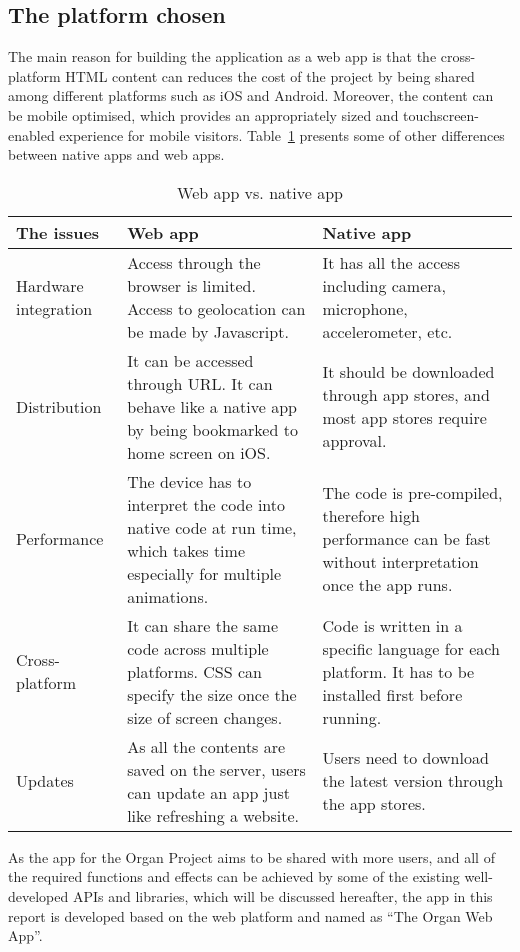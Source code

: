 \subsection{The platform chosen}
The main reason for building the application as a web app is that the cross-platform HTML content can reduces the cost of the project by being shared among different platforms such as iOS and Android. Moreover, the content can be mobile optimised, which provides an appropriately sized and touchscreen-enabled experience for mobile visitors. Table~\ref{ta:appCompare} presents some of other differences between native apps and web apps. 
\begin{table}
\begin{center}
\begin{tabularx}{\linewidth}{ l X X }
\hline
\textbf{The issues} & \textbf{Web app} & \textbf{Native app} \\
\hline
Hardware integration & Access through the browser is limited. Access to geolocation can be made by Javascript. & It has all the access including camera, microphone, accelerometer, etc.\\
\hline
Distribution & It can be accessed through URL. It can behave like a native app by being bookmarked to home screen on iOS. & It should be downloaded through app stores, and most app stores require approval.\\
\hline
Performance & The device has to interpret the code into native code at run time, which takes time especially for multiple animations. & The code is pre-compiled, therefore high performance can be fast without interpretation once the app runs.\\
\hline
Cross-platform & It can share the same code across multiple platforms. CSS can specify the size once the size of screen changes. & Code is written in a specific language for each platform. It has to be installed first before running.\\
\hline
Updates & As all the contents are saved on the server, users can update an app just like refreshing a website. & Users need to download the latest version through the app stores.\\
\hline
\end{tabularx}
\caption{Web app vs. native app} \label{ta:appCompare} 
\end{center}
\end{table}
As the app for the Organ Project aims to be shared with more users, and all of the required functions and effects can be achieved by some of the existing well-developed APIs and libraries, which will be discussed hereafter, the app in this report is developed based on the web platform and named as \enquote{The Organ Web App}.

